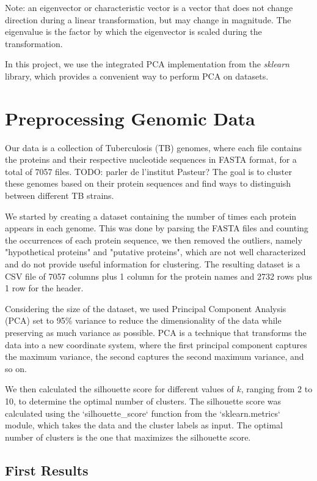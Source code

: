 Note: an eigenvector or characteristic vector is a vector that does not change direction during a linear transformation,
but may change in magnitude. The eigenvalue is the factor by which the eigenvector is scaled during the transformation.

In this project, we use the integrated PCA implementation from the \textit{sklearn} library, which provides a convenient way to perform PCA
on datasets.

\section{Preprocessing Genomic Data}
\label{sec:preprocessing_genomic_data}

Our data is a collection of Tuberculosis (TB) genomes, where each file contains the proteins and their respective
nucleotide sequences in FASTA format, for a total of 7057 files.
TODO: parler de l'institut Pasteur?
The goal is to cluster these genomes based on their protein sequences and find ways to distinguish between different
TB strains.

We started by creating a dataset containing the number of times each protein appears in each genome. This was done by
parsing the FASTA files and counting the occurrences of each protein sequence, we then removed the outliers, namely
"hypothetical proteins" and "putative proteins", which are not well characterized and do not provide useful information
for clustering. The resulting dataset is a CSV file of 7057 columns plus 1 column for the protein names and 2732 rows
plus 1 row for the header.

Considering the size of the dataset, we used Principal Component Analysis (PCA) set to 95\% variance to reduce the dimensionality
of the data while preserving as much variance as possible. PCA is a technique that transforms the data into a new coordinate
system, where the first principal component captures the maximum variance, the second captures the second maximum variance,
and so on.

We then calculated the silhouette score for different values of $k$, ranging from 2 to 10, to determine the optimal number
of clusters. The silhouette score was calculated using the `silhouette_score` function from the `sklearn.metrics` module,
which takes the data and the cluster labels as input. The optimal number of clusters is the one that maximizes the silhouette
score.

\subsection{First Results}
\label{subsec:first_results}

